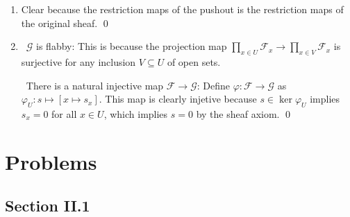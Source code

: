\documentclass{article}
\theoremstyle{plain}
\theoremstyle{definition}
\DeclareMathOperator{\res}{res}
\begin{document}
\begin{tcolorbox}
\begin{enumerate}
        Since $\mathscr{F}'$ is flabby, the map $\psi_V$ is surjective. Also, $\mathscr{F}$ is flabby implies the surjectivity of $\res$ by definition. Hence, the composition of these two maps is surjective. This means, $\res'' \circ \psi_U = \psi_V \circ \res$ is surjective, so $\res''$ must be surjective. \qed

        \item Clear because the restriction maps of the pushout is the restriction maps of the original sheaf. \qed
        
        \item {}\, $\mathscr{G}$ is flabby: This is because the projection map $\prod_{x \in U} \mathscr{F}_x \to \prod_{x \in V} \mathscr{F}_x$ is surjective for any inclusion $V \subseteq U$ of open sets.
        
        \, There is a natural injective map $\mathscr{F} \to \mathscr{G}$: Define $\varphi: \mathscr{F} \to \mathscr{G}$ as $\varphi_U: s \mapsto [x \mapsto s_x]$. This map is clearly injetive because $s \in \ker \varphi_U$ implies $s_x = 0$ for all $x \in U$, which implies $s = 0$ by the sheaf axiom. \qed
    \end{enumerate}
\end{tcolorbox}

\newpage

\section*{Problems}

\subsection*{Section II.1}
\end{document}
